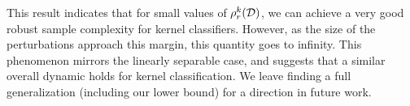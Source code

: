 This result indicates that for small values of $\rho_r^k({\mathcal D})$, we can achieve a very good robust sample complexity for kernel classifiers. However, as the size of the perturbations approach this margin, this quantity goes to infinity. This phenomenon mirrors the linearly separable case, and suggests that a similar overall dynamic holds for kernel classification. We leave finding a full generalization (including our lower bound) for a direction in future work.






%
%
%
%
%
%
%